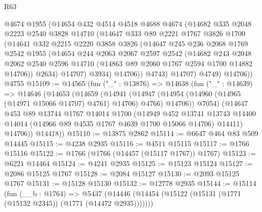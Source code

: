 \begin{lexlean}{R63}
\begin{coremodule}
            @4674
            @1955
            (@14654
              @432
              @4514
              @4518
              @4688
              @4674
              (@14682
                @335
                @2048
                @2223
                @2540
                @3828
                @14710
                (@14647
                  @333
                  @89
                  @2221
                  @1767
                  @3826
                  @1700
                  (@14641
                    @332
                    @2215
                    @2220
                    @3858
                    @3826
                    (@14647
                      @245
                      @236
                      @2068
                      @1769
                      @2542
                      @1955
                      (@14654
                        @244
                        @2063
                        @2067
                        @2597
                        @2542
                        (@14682
                          @243
                          @2048
                          @2062
                          @2540
                          @2596
                          @14710
                          (@14863 @89 @2060 @1767 @2594 @1700 @14882 @14706))
                        @2634)
                      @14707)
                    @3934)
                  @14706))
              @4743)
            @14707)
          @4749)
        @14706))
    @4755
@15109 := @14565
    (fun ("_" : @13876) =>
    @14638
      (fun ("_" : @14639) =>
      @14646
        (@14653
          (@14659
            (@14941
              (@14947 (@14954 (@14960 (@14965 (@14971 @15066 @14707) @4761) @14706) @4766) @14706))
            @7054)
          (@14647
            @453
            @89
            @13744
            @1767
            @14014
            @1700
            (@14949
              @452
              @13741
              @13743
              @14400
              @14014
              (@14966 @89 @4535 @1767 @4639 @1700 @15066 @14706)
              @14411)
            @14706))
        @14418))
@15110 := @13875 @2862
@15114 := @6647 @464 @83 @509 @14445
@15115 := @4238 @2935
@15116 := @4511 @15115
@15117 := @1766 @15116
@15122 := @1766 (@1766 (@14457 (@15117 @1767)) @1767)
@15123 := @6221 @14464
@15124 := @4241 @2935
@15125 := @15123 @15124
@15127 := @2086 @15125 @1767
@15128 := @2084 @15127
@15130 := @2093 @15125 @1767
@15131 := @15128 @15130
@15132 := @12778 @2935
@15144 := @15114
    (fun (__b : @1764) =>
    @5437 (@14446 (@14454 (@15122 (@15131 (@1771 (@15132 @2345)) (@1771 (@14472 @2935)))))))

\end{coremodule}
\end{lexlean}
